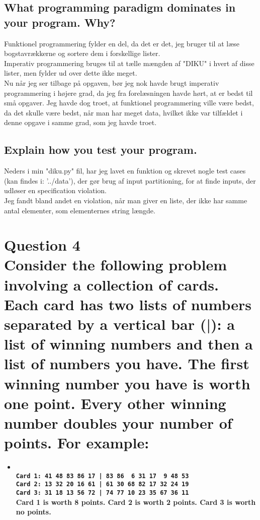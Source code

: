 \documentclass[a4paper,12pt]{article}
\begin{document}
\subsection[What programming paradigm dominates in your program]{What programming paradigm dominates in your program. Why?}

Funktionel programmering fylder en del, da det er det, jeg bruger til at læse bogstavrækkerne og sortere dem i forskellige lister.\\
Imperativ programmering bruges til at tælle mængden af "DIKU" i hvert af disse lister, men fylder ud over dette ikke meget.\\
Nu når jeg ser tilbage på opgaven, bør jeg nok havde brugt imperativ programmering i højere grad, da jeg fra forelæsningen havde hørt, at er bedst til små opgaver. Jeg havde dog troet, at funktionel programmering ville være bedst, da det skulle være bedst, når man har meget data, hvilket ikke var tilfældet i denne opgave i samme grad, som jeg havde troet.

\subsection[Explain how you test your program]{Explain how you test your program.}

Neders i min "diku.py" fil, har jeg lavet en funktion og skrevet nogle test cases (kan findes i: '../data'), der gør brug af input partitioning, for at finde inputs, der udløser en specification violation.\\
Jeg fandt bland andet en violation, når man giver en liste, der ikke har samme antal elementer, som elementernes string længde.

\section[Question 4 - Cards]{Question 4\\
Consider the following problem involving a collection of cards.
Each card has two lists of numbers separated by a vertical bar (|): a list of winning numbers and then a list of numbers you have.
The first winning number you have is worth one point. Every other winning number doubles your number of points.
For example:}
\begin{itemize}
    \item[] \textbf{\\
    \lstinline{Card 1: 41 48 83 86 17 | 83 86  6 31 17  9 48 53}\\
    \lstinline{Card 2: 13 32 20 16 61 | 61 30 68 82 17 32 24 19}\\
    \lstinline{Card 3: 31 18 13 56 72 | 74 77 10 23 35 67 36 11}\\
    Card 1 is worth 8 points. Card 2 is worth 2 points. Card 3 is worth no points.}
\end{itemize}
\end{document}
